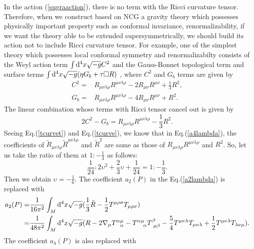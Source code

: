 \documentclass{ptephy}%
\begin{document}
In the action (\ref{sugraaction}), there is no term with the Ricci curvature tensor. Therefore, 
when we construct based on NCG a gravity theory which possesses physically important property such as 
conformal invariance, renormalizability, if we want the theory able to be extended supersymmetrically, 
we should build its action not to include Ricci curvature tensor. 
For example, 
one of the simplest theory which possesses local conformal symmetry and renormalizabilty 
consists of the Weyl action term $\int {\rm d}^4 x \sqrt{-g} C^2 $ and the Gauss-Bonnet topological 
term and surface terms 
$\int {\rm d}^4 x \sqrt{-g}(\eta G_b + \tau \Box R) $ \cite{Berredo}
, where $C^2$ and $G_b$ terms are given by 
\begin{align}
C^2 = & R_{\mu\nu\lambda\rho}R^{\mu\nu\lambda\rho}-2R_{\mu\nu}R^{\mu\nu}+\frac{1}{3}R^2, \\
G_b = & R_{\mu\nu\lambda\rho}R^{\mu\nu\lambda\rho}-4R_{\mu\nu}R^{\mu\nu}+R^2.
\end{align}
The linear combination whose 
terms with Ricci tensor cancel out is given by
\begin{equation}
2C^2-G_b = R_{\mu\nu\lambda\rho}R^{\mu\nu\lambda\rho} -\frac{1}{3}R^2.
\end{equation} 
Seeing Eq.(\ref{tcurvet}) and Eq.(\ref{tcurve}), we know that in Eq.(\ref{a4lambda}), the coefficients of 
$\tilde{R}_{\mu\nu\lambda\rho}\tilde{R}^{\mu\nu\lambda\rho}$ and $\tilde{R}^2$ are same as those of 
$R_{\mu\nu\lambda\rho}R^{\mu\nu\lambda\rho}$ and $R^2$. 
So, let us take the ratio of them at $1:-\frac{1}{3}$ as follows:
\begin{equation}
\frac{1}{24} : 2\upsilon^2+\frac{2}{3}\upsilon+\frac{1}{24} = 1:-\frac{1}{3}.
\end{equation}
Then we obtain $\upsilon = -\frac{1}{6}$. The coefficient $a_2(P)$ in the Eq.(\ref{a2lambda}) is replaced with
\begin{align}
a_2(P) = & \frac{1}{16\pi^2}\int_M {\rm d}^4x\sqrt{-g}
(\frac{1}{3}\tilde{R}-\frac{1}{2}T^{\mu\rho\sigma}T_{\mu\rho\sigma}) \nonumber \\
= & \frac{1}{48\pi^2}\int_M {\rm d}^4x\sqrt{-g}
(R-2\nabla_\mu T^{\alpha\mu}_{\ \ \alpha}-T^{\alpha\mu}_{\ \ \ \alpha}T^\beta_{\ \mu\beta}
-\frac{5}{4}T^{\mu\nu\lambda}T_{\mu\nu\lambda}+\frac{1}{2}T^{\mu\nu\lambda}T_{\lambda\nu\mu}
). \label{a2R}
\end{align} 
The coefficient $a_4(P)$ is also replaced with  
\end{document}
